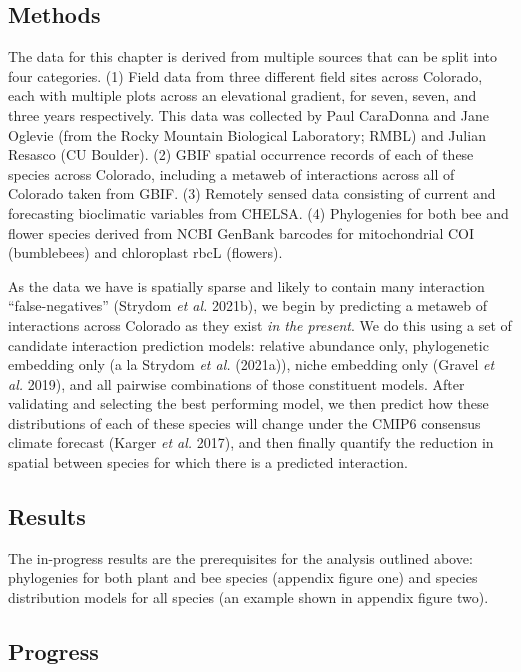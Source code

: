 \documentclass[10pt,oneside]{article}
\begin{document}
\hypertarget{methods-1}{%
\subsection{Methods}\label{methods-1}}

The data for this chapter is derived from multiple sources that can be
split into four categories. (1) Field data from three different field
sites across Colorado, each with multiple plots across an elevational
gradient, for seven, seven, and three years respectively. This data was
collected by Paul CaraDonna and Jane Oglevie (from the Rocky Mountain
Biological Laboratory; RMBL) and Julian Resasco (CU Boulder). (2) GBIF
spatial occurrence records of each of these species across Colorado,
including a metaweb of interactions across all of Colorado taken from
GBIF. (3) Remotely sensed data consisting of current and forecasting
bioclimatic variables from CHELSA. (4) Phylogenies for both bee and
flower species derived from NCBI GenBank barcodes for mitochondrial COI
(bumblebees) and chloroplast rbcL (flowers).

As the data we have is spatially sparse and likely to contain many
interaction ``false-negatives'' (Strydom \emph{et al.} 2021b), we begin
by predicting a metaweb of interactions across Colorado as they exist
\emph{in the present}. We do this using a set of candidate interaction
prediction models: relative abundance only, phylogenetic embedding only
(a la Strydom \emph{et al.} (2021a)), niche embedding only (Gravel
\emph{et al.} 2019), and all pairwise combinations of those constituent
models. After validating and selecting the best performing model, we
then predict how these distributions of each of these species will
change under the CMIP6 consensus climate forecast (Karger \emph{et al.}
2017), and then finally quantify the reduction in spatial between
species for which there is a predicted interaction.

\hypertarget{results-1}{%
\subsection{Results}\label{results-1}}

The in-progress results are the prerequisites for the analysis outlined
above: phylogenies for both plant and bee species (appendix figure one)
and species distribution models for all species (an example shown in
appendix figure two).

\hypertarget{progress-1}{%
\subsection{Progress}\label{progress-1}}
\end{document}
